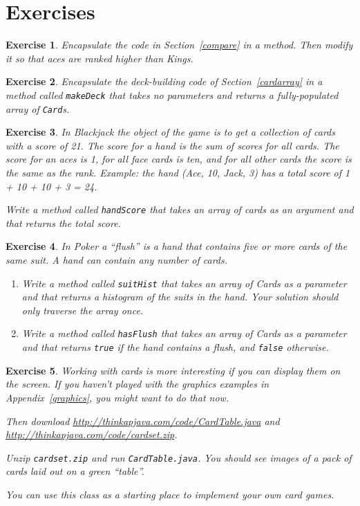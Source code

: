 \documentclass[12pt]{book}
\theoremstyle{exercise}
\newtheorem{exercise}{Exercise}[chapter]
\begin{document}
\section{Exercises}

\begin{exercise}
Encapsulate the code in Section~\ref{compare} in a method.
Then modify it so that aces are ranked higher than Kings.
\end{exercise}


\begin{exercise}
Encapsulate the deck-building code of Section~\ref{cardarray} in a method called
{\tt makeDeck} that takes no parameters and returns a
fully-populated array of {\tt Card}s.
\end{exercise}


\begin{exercise}
In Blackjack the object of the game is to get a collection of cards
with a score of 21.  The score for a hand is the sum of scores for all
cards.  The score for an aces is 1, for all face cards is ten, and
for all other cards the score is the same as the rank.  Example: the
hand (Ace, 10, Jack, 3) has a total score of 1 + 10 + 10 + 3 = 24.

Write a method called {\tt handScore} that takes an array of cards as
an argument and that returns the total score.
\end{exercise}


\begin{exercise}
In Poker a ``flush'' is a hand that contains five
or more cards of the same suit.  A hand can contain any number of cards.

\begin{enumerate}

\item Write a method called {\tt suitHist} that takes an array of Cards as a
parameter and that returns a histogram of the suits in the hand.
Your solution should only traverse the array once.

\item Write a method called {\tt hasFlush} that takes an array of Cards as a
parameter and that returns {\tt true} if the hand contains a flush,
and {\tt false} otherwise.

\end{enumerate}

\end{exercise}


\begin{exercise}
Working with cards is more interesting if you can display them on
the screen.  If you haven't played with the graphics examples in
Appendix~\ref{graphics}, you might want to do that now.

Then download
\url{http://thinkapjava.com/code/CardTable.java}
and
\url{http://thinkapjava.com/code/cardset.zip}.

Unzip {\tt cardset.zip} and run {\tt CardTable.java}.  You
should see images of a pack of cards laid out on a green ``table''.

You can use this class as a starting place to implement your own
card games.
\end{exercise}
\end{document}
